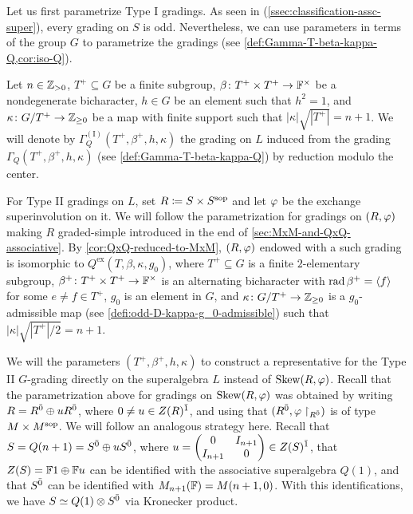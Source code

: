 Let us first parametrize Type I gradings. 
As seen in (\cref{ssec:classification-assc-super}), every grading on $S$ is odd. 
Nevertheless, we can use parameters in terms of the group $G$ to parametrize the gradings (see \cref{def:Gamma-T-beta-kappa-Q,cor:iso-Q}).  

\begin{defi}\label{def:Q-Type-I}
    Let $n \in \mathbb{Z}_{> 0}$, $T^+ \subseteq G$ be a finite subgroup, $\beta\colon T^+ \times T^+ \to \mathbb{F}^\times$ be a nondegenerate bicharacter, $h\in G$ be an element such that $h^2 = 1$, and $\kappa\colon G/T^+ \to \mathbb{Z}_{\geq 0}$ be a map with finite support such that $|\kappa| \sqrt{|T^+|} = n + 1$. 
    We will denote by $\Gamma^{\mathrm{(I)}}_Q(T^+, \beta^+, h, \kappa)$ the grading on $L$ induced from the grading $\Gamma_Q (T^+, \beta^+, h, \kappa)$ (see \cref{def:Gamma-T-beta-kappa-Q}) by reduction modulo the center. 
\end{defi}

For Type II gradings on $L$,
set $R \coloneqq S\times S^{\mathrm{sop}}$ and let $\varphi$ be the exchange superinvolution on it. 
We will follow the parametrization for gradings on $(R, \varphi)$ making $R$ graded-simple introduced in the end of \cref{sec:MxM-and-QxQ-associative}. 
By  \cref{cor:QxQ-reduced-to-MxM}, $(R, \varphi)$ endowed with a such grading is isomorphic to $Q^{\mathrm{ex}} (T, \beta, \kappa, g_0)$, where $T^+ \subseteq G$ is a finite $2$-elementary subgroup, $\beta^+\colon T^+\times T^+ \to \mathbb{F}^\times$ is an alternating bicharacter with $\operatorname{rad} \beta^+ = \langle f \rangle$ for some $e\neq f \in T^+$, $g_0$ is an element in $G$, and $\kappa\colon G/T^+ \to \mathbb{Z}_{\geq 0}$ is a $g_0$-admissible map (see \cref{defi:odd-D-kappa-g_0-admissible}) such that $|\kappa| \sqrt{|T^+|/2} = n+1$. 

We will the parameters $(T^+, \beta^+, h, \kappa)$ to construct a representative for the Type II $G$-grading directly on the superalgebra $L$ instead of $\operatorname{Skew}(R, \varphi)$. 
Recall that the parametrization above for gradings on $\operatorname{Skew}(R, \varphi)$ was obtained by writing $R = R^{\bar0} \oplus u R^{\bar0}$, where $0 \neq u \in Z(R)^{\bar1}$, and using that $(R^{\bar0}, \varphi\restriction_{R^{\bar0}})$ is of type $M\times M^{\mathrm{sop}}$.  
We will follow an analogous strategy here. 
Recall that $S = Q(n+1) = S^{\bar0} \oplus u S^{\bar0}$, where
$
    u = \begin{pmatrix}
            0 & I_{n+1}\\
            I_{n+1} & 0\\
        \end{pmatrix} \in Z(S)^{\bar1}
$,
that $Z(S) = \mathbb{F}1 \oplus \mathbb{F} u$ can be identified with the associative superalgebra $Q(1)$, and that $S^{\bar0}$ can be identified with $M_{n+1}(\mathbb{F}) = M(n+1, 0)$. 
With this identifications, we have $S \simeq Q(1)\otimes S^{\bar0}$ via Kronecker product. 


